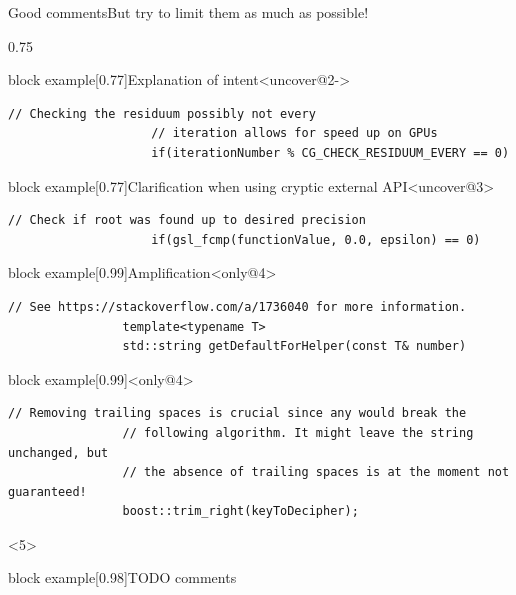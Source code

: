 \begin{frame}[fragile]{Good comments}{But try to limit them as much as possible!}
\begin{overlayarea}{\textwidth}{0.75\textheight}
\begin{onlyenv}
            \begin{varblock}{block example}[0.77\textwidth]{Explanation of intent}<uncover@2->
                \begin{lstlisting}[style=MyCpp]
                    // Checking the residuum possibly not every
                    // iteration allows for speed up on GPUs
                    if(iterationNumber % CG_CHECK_RESIDUUM_EVERY == 0)
                \end{lstlisting}
            \end{varblock}
            \begin{varblock}{block example}[0.77\textwidth]{Clarification when using cryptic external API}<uncover@3>
                \begin{lstlisting}[style=MyCpp]
                    // Check if root was found up to desired precision
                    if(gsl_fcmp(functionValue, 0.0, epsilon) == 0)
                \end{lstlisting}
            \end{varblock}
        \end{onlyenv}
        \begin{varblock}{block example}[0.99\textwidth]{Amplification}<only@4>
            \begin{lstlisting}[style=MyCpp]
                // See https://stackoverflow.com/a/1736040 for more information.
                template<typename T>
                std::string getDefaultForHelper(const T& number)
            \end{lstlisting}
        \end{varblock}
        \vspace{-1mm}
        \begin{varblock}{block example}[0.99\textwidth]{}<only@4>
            \begin{lstlisting}[style=MyCpp]
                // Removing trailing spaces is crucial since any would break the
                // following algorithm. It might leave the string unchanged, but
                // the absence of trailing spaces is at the moment not guaranteed!
                boost::trim_right(keyToDecipher);
            \end{lstlisting}
        \end{varblock}
        \begin{onlyenv}<5>
            \begin{varblock}{block example}[0.98\textwidth]{TODO comments}
                \begin{lstlisting}[style=MyCpp]

\end{lstlisting}
\end{varblock}
\end{onlyenv}
\end{overlayarea}
\end{frame}
